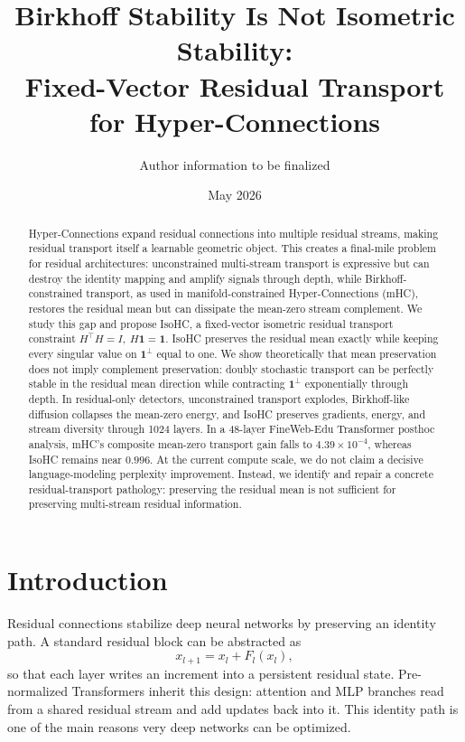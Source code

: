 \documentclass[10pt]{article}
\title{
Birkhoff Stability Is Not Isometric Stability:\\
Fixed-Vector Residual Transport for Hyper-Connections
}
\author{
Author information to be finalized
}
\date{May 2026}
\newcommand{\one}{\mathbf{1}}
\newcommand{\operp}{\one^{\perp}}
\begin{document}
\maketitle

\begin{abstract}
Hyper-Connections expand residual connections into multiple residual streams,
making residual transport itself a learnable geometric object.  This creates a
final-mile problem for residual architectures: unconstrained multi-stream
transport is expressive but can destroy the identity mapping and amplify signals
through depth, while Birkhoff-constrained transport, as used in
manifold-constrained Hyper-Connections (mHC), restores the residual mean but can
dissipate the mean-zero stream complement.  We study this gap and propose
IsoHC, a fixed-vector isometric residual transport constraint
$H^\top H=I,\ H\one=\one$.  IsoHC preserves the residual mean exactly while
keeping every singular value on $\operp$ equal to one.  We show theoretically
that mean preservation does not imply complement preservation: doubly stochastic
transport can be perfectly stable in the residual mean direction while
contracting $\operp$ exponentially through depth.  In residual-only detectors,
unconstrained transport explodes, Birkhoff-like diffusion collapses the
mean-zero energy, and IsoHC preserves gradients, energy, and stream diversity
through 1024 layers.  In a 48-layer FineWeb-Edu Transformer posthoc analysis,
mHC's composite mean-zero transport gain falls to $4.39\times10^{-4}$, whereas
IsoHC remains near $0.996$.  At the current compute scale, we do not claim a
decisive language-modeling perplexity improvement.  Instead, we identify and
repair a concrete residual-transport pathology: preserving the residual mean is
not sufficient for preserving multi-stream residual information.
\end{abstract}

\section{Introduction}

Residual connections stabilize deep neural networks by preserving an identity
path.  A standard residual block can be abstracted as
\begin{equation}
    x_{l+1}=x_l+F_l(x_l),
\end{equation}
so that each layer writes an increment into a persistent residual state.
Pre-normalized Transformers inherit this design: attention and MLP branches read
from a shared residual stream and add updates back into it.  This identity path
is one of the main reasons very deep networks can be optimized.
\end{document}
